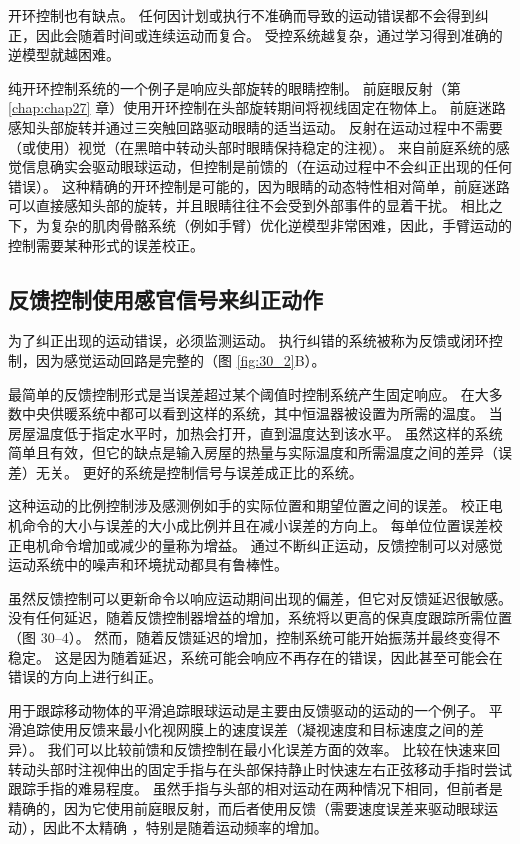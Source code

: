 开环控制也有缺点。
任何因计划或执行不准确而导致的运动错误都不会得到纠正，因此会随着时间或连续运动而复合。
受控系统越复杂，通过学习得到准确的逆模型就越困难。


纯开环控制系统的一个例子是响应头部旋转的眼睛控制。 前庭眼反射（第 \ref{chap:chap27} 章）使用开环控制在头部旋转期间将视线固定在物体上。
前庭迷路感知头部旋转并通过三突触回路驱动眼睛的适当运动。
反射在运动过程中不需要（或使用）视觉（在黑暗中转动头部时眼睛保持稳定的注视）。
来自前庭系统的感觉信息确实会驱动眼球运动，但控制是前馈的（在运动过程中不会纠正出现的任何错误）。
这种精确的开环控制是可能的，因为眼睛的动态特性相对简单，前庭迷路可以直接感知头部的旋转，并且眼睛往往不会受到外部事件的显着干扰。
相比之下，为复杂的肌肉骨骼系统（例如手臂）优化逆模型非常困难，因此，手臂运动的控制需要某种形式的误差校正。



\subsection{反馈控制使用感官信号来纠正动作}

为了纠正出现的运动错误，必须监测运动。
执行纠错的系统被称为反馈或闭环控制，因为感觉运动回路是完整的（图 \ref{fig:30_2}B）。


最简单的反馈控制形式是当误差超过某个阈值时控制系统产生固定响应。
在大多数中央供暖系统中都可以看到这样的系统，其中恒温器被设置为所需的温度。
当房屋温度低于指定水平时，加热会打开，直到温度达到该水平。
虽然这样的系统简单且有效，但它的缺点是输入房屋的热量与实际温度和所需温度之间的差异（误差）无关。
更好的系统是控制信号与误差成正比的系统。


这种运动的比例控制涉及感测例如手的实际位置和期望位置之间的误差。
校正电机命令的大小与误差的大小成比例并且在减小误差的方向上。
每单位位置误差校正电机命令增加或减少的量称为增益。
通过不断纠正运动，反馈控制可以对感觉运动系统中的噪声和环境扰动都具有鲁棒性。


虽然反馈控制可以更新命令以响应运动期间出现的偏差，但它对反馈延迟很敏感。
没有任何延迟，随着反馈控制器增益的增加，系统将以更高的保真度跟踪所需位置（图 30–4）。
然而，随着反馈延迟的增加，控制系统可能开始振荡并最终变得不稳定。
这是因为随着延迟，系统可能会响应不再存在的错误，因此甚至可能会在错误的方向上进行纠正。


用于跟踪移动物体的平滑追踪眼球运动是主要由反馈驱动的运动的一个例子。
平滑追踪使用反馈来最小化视网膜上的速度误差（凝视速度和目标速度之间的差异）。
我们可以比较前馈和反馈控制在最小化误差方面的效率。
比较在快速来回转动头部时注视伸出的固定手指与在头部保持静止时快速左右正弦移动手指时尝试跟踪手指的难易程度。
虽然手指与头部的相对运动在两种情况下相同，但前者是精确的，因为它使用前庭眼反射，而后者使用反馈（需要速度误差来驱动眼球运动），因此不太精确 ，特别是随着运动频率的增加。


